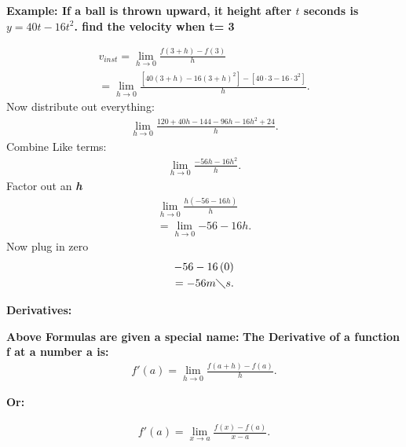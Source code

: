 \documentclass{report}
\begin{document}
        \bigbreak \noindent \bigbreak \noindent 
        \begin{large}
            \textbf{Example: If a ball is thrown upward, it height after $t$ seconds 
            is $y= 40t-16t^2$. find the velocity when t= 3
        }
        \end{large}
        \bigbreak \noindent \bigbreak \noindent \bigbreak \noindent 
        \begin{align*}
            v_{inst} = \lim\limits_{h \to 0}{ \frac{f(3+h) - f(3)}{h}} \\ 
            = \lim\limits_{h \to 0}{ \frac{[40(3+h) - 16(3+h)^2] - [40 \cdot 3 - 16 \cdot 3^2]}{h}}
        .\end{align*}
        \bigbreak \noindent 
        Now distribute out everything:
        \begin{align*}
            \lim\limits_{h \to 0}{ \frac{120+40h-144-96h-16h^2+24}{h}}
        .\end{align*}
        \bigbreak \noindent 
        Combine Like terms:
        \begin{align*}
            \lim\limits_{h \to 0}{ \frac{-56h-16h^2}{h}}
        .\end{align*}
        \bigbreak \noindent 
        Factor out an \textbf{\textit{h}}
        \begin{align*}
            \lim\limits_{h \to 0}{ \frac{h \left(-56-16h\right)}{h}} \\
            = \lim\limits_{h \to 0}{-56-16h}
        .\end{align*}
        \bigbreak \noindent 
        Now plug in zero
        \begin{align*}
            -56 -16 \left(0\right) \\ 
            = -56 m \diagdown s
        .\end{align*}

        \pagebreak \bigbreak \noindent
        \begin{large}
            \textbf{Derivatives:}
        \end{large}
        \bigbreak \noindent \bigbreak \noindent \bigbreak \noindent   
        \textbf{Above Formulas are given a special name:}
        \bigbreak \noindent 
        \textbf{The Derivative of a function f at a number a is:}
        \begin{align*}
            f\prime (a) = \lim\limits_{h \to 0}{ \frac{f(a+h) - f(a)}{h}}
        .\end{align*}
        \bigbreak \noindent 
        \begin{center}
            \textbf{Or:}
        \end{center}
        \begin{align*}
            f\prime (a) = \lim\limits_{x \to a}{ \frac{f(x) - f(a)}{x -a }}
        .\end{align*}
\end{document}
